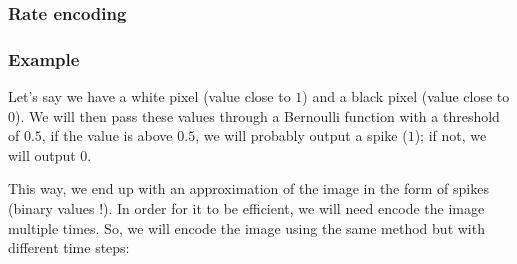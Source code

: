 \documentclass[11pt]{article}
\begin{document}
\subsubsection{Rate encoding}

\subsubsection*{Example}

Let's say we have a white pixel (value close to $1$) and a black pixel (value close to $0$). We will then pass these values through a Bernoulli function with a threshold of $0.5$, if the value is above $0.5$, we will probably output a spike ($1$); if not, we will output $0$.

This way, we end up with an approximation of the image in the form of spikes (binary values !). In order for it to be efficient, we will need encode the image multiple times. So, we will encode the image using the same method but with different time steps:
\end{document}
